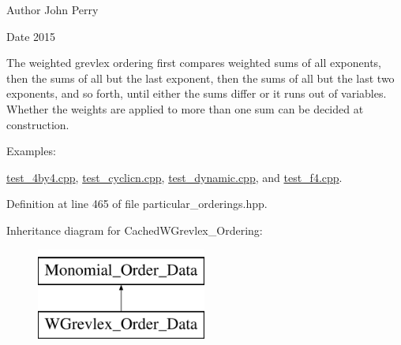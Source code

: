 \begin{DoxyAuthor}{Author}
John Perry 
\end{DoxyAuthor}
\begin{DoxyDate}{Date}
2015
\end{DoxyDate}
The weighted grevlex ordering first compares weighted sums of all exponents, then the sums of all but the last exponent, then the sums of all but the last two exponents, and so forth, until either the sums differ or it runs out of variables. Whether the weights are applied to more than one sum can be decided at construction. \begin{Desc}
\item[Examples\+: ]\par
\hyperlink{test_4by4_8cpp-example}{test\+\_\+4by4.\+cpp}, \hyperlink{test_cyclicn_8cpp-example}{test\+\_\+cyclicn.\+cpp}, \hyperlink{test_dynamic_8cpp-example}{test\+\_\+dynamic.\+cpp}, and \hyperlink{test_f4_8cpp-example}{test\+\_\+f4.\+cpp}.\end{Desc}


Definition at line 465 of file particular\+\_\+orderings.\+hpp.

Inheritance diagram for Cached\+W\+Grevlex\+\_\+\+Ordering\+:\begin{figure}[H]
\begin{center}
\leavevmode
\includegraphics[height=3.000000cm]{group__orderinggroup}
\end{center}
\end{figure}
